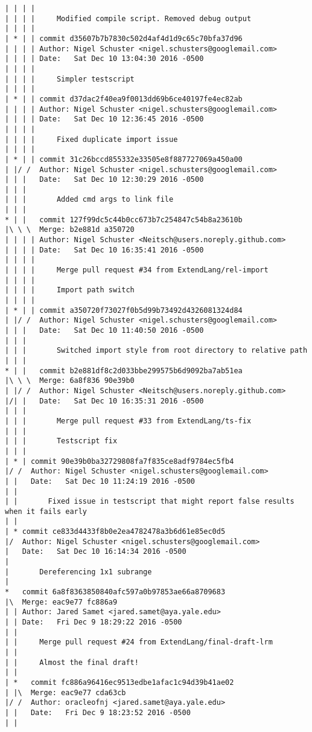 \begin{lstlisting}
| | | | 
| | | |     Modified compile script. Removed debug output
| | | |     
| * | | commit d35607b7b7830c502d4af4d1d9c65c70bfa37d96
| | | | Author: Nigel Schuster <nigel.schusters@googlemail.com>
| | | | Date:   Sat Dec 10 13:04:30 2016 -0500
| | | | 
| | | |     Simpler testscript
| | | |     
| * | | commit d37dac2f40ea9f0013dd69b6ce40197fe4ec82ab
| | | | Author: Nigel Schuster <nigel.schusters@googlemail.com>
| | | | Date:   Sat Dec 10 12:36:45 2016 -0500
| | | | 
| | | |     Fixed duplicate import issue
| | | |     
| * | | commit 31c26bccd855332e33505e8f887727069a450a00
| |/ /  Author: Nigel Schuster <nigel.schusters@googlemail.com>
| | |   Date:   Sat Dec 10 12:30:29 2016 -0500
| | |   
| | |       Added cmd args to link file
| | |      
* | |   commit 127f99dc5c44b0cc673b7c254847c54b8a23610b
|\ \ \  Merge: b2e881d a350720
| | | | Author: Nigel Schuster <Neitsch@users.noreply.github.com>
| | | | Date:   Sat Dec 10 16:35:41 2016 -0500
| | | | 
| | | |     Merge pull request #34 from ExtendLang/rel-import
| | | |     
| | | |     Import path switch
| | | |     
| * | | commit a350720f73027f0b5d99b73492d4326081324d84
| |/ /  Author: Nigel Schuster <nigel.schusters@googlemail.com>
| | |   Date:   Sat Dec 10 11:40:50 2016 -0500
| | |   
| | |       Switched import style from root directory to relative path
| | |      
* | |   commit b2e881df8c2d033bbe299575b6d9092ba7ab51ea
|\ \ \  Merge: 6a8f836 90e39b0
| |/ /  Author: Nigel Schuster <Neitsch@users.noreply.github.com>
|/| |   Date:   Sat Dec 10 16:35:31 2016 -0500
| | |   
| | |       Merge pull request #33 from ExtendLang/ts-fix
| | |       
| | |       Testscript fix
| | |    
| * | commit 90e39b0ba32729808fa7f835ce8adf9784ec5fb4
|/ /  Author: Nigel Schuster <nigel.schusters@googlemail.com>
| |   Date:   Sat Dec 10 11:24:19 2016 -0500
| |   
| |       Fixed issue in testscript that might report false results when it fails early
| |   
| * commit ce833d4433f8b0e2ea4782478a3b6d61e85ec0d5
|/  Author: Nigel Schuster <nigel.schusters@googlemail.com>
|   Date:   Sat Dec 10 16:14:34 2016 -0500
|   
|       Dereferencing 1x1 subrange
|    
*   commit 6a8f8363850840afc597a0b97853ae66a8709683
|\  Merge: eac9e77 fc886a9
| | Author: Jared Samet <jared.samet@aya.yale.edu>
| | Date:   Fri Dec 9 18:29:22 2016 -0500
| | 
| |     Merge pull request #24 from ExtendLang/final-draft-lrm
| |     
| |     Almost the final draft!
| |     
| *   commit fc886a96416ec9513edbe1afac1c94d39b41ae02
| |\  Merge: eac9e77 cda63cb
|/ /  Author: oracleofnj <jared.samet@aya.yale.edu>
| |   Date:   Fri Dec 9 18:23:52 2016 -0500
| |   

\end{lstlisting}

